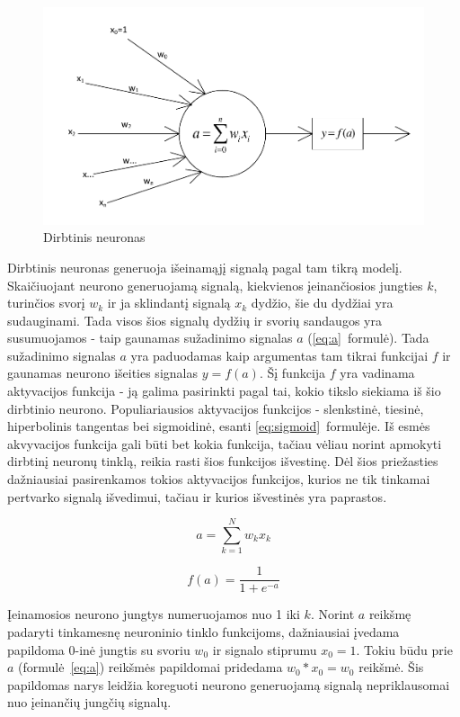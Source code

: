 \documentclass{VUMIFPSbakalaurinis}
\begin{document}
\begin{figure}
	\includegraphics[scale=0.75]{diagrams/1_neuron}
	\caption{Dirbtinis neuronas}
	\label{fig:neuron}
\end{figure}

Dirbtinis neuronas generuoja išeinamąjį signalą pagal tam tikrą modelį.
Skaičiuojant neurono generuojamą signalą, kiekvienos įeinančiosios jungties $k$, turinčios svorį $w_k$ ir ja sklindantį signalą $x_k$ dydžio, šie du dydžiai yra sudauginami.
Tada visos šios signalų dydžių ir svorių sandaugos yra susumuojamos - taip gaunamas sužadinimo signalas $a$ (\ref{eq:a}~formulė).
Tada sužadinimo signalas $a$ yra paduodamas kaip argumentas tam tikrai funkcijai $f$ ir gaunamas neurono išeities signalas $y = f(a)$.
Šį funkcija $f$ yra vadinama aktyvacijos funkcija - ją galima pasirinkti pagal tai, kokio tikslo siekiama iš šio dirbtinio neurono.
Populiariausios aktyvacijos funkcijos - slenkstinė, tiesinė, hiperbolinis tangentas bei sigmoidinė, esanti \ref{eq:sigmoid}~formulėje.
Iš esmės akvyvacijos funkcija gali būti bet kokia funkcija, tačiau vėliau norint apmokyti dirbtinį neuronų tinklą, reikia rasti šios funkcijos išvestinę.
Dėl šios priežasties dažniausiai pasirenkamos tokios aktyvacijos funkcijos, kurios ne tik tinkamai pertvarko signalą išvedimui, tačiau ir kurios išvestinės yra paprastos.

\begin{equation} \label{eq:a}
a = \sum_{k=1}^N w_kx_k
\end{equation}

\begin{equation} \label{eq:sigmoid}
f(a) = \frac{1}{1 + e^{-a}}
\end{equation}

Įeinamosios neurono jungtys numeruojamos nuo 1 iki $k$.
Norint $a$ reikšmę padaryti tinkamesnę neuroninio tinklo funkcijoms, dažniausiai įvedama papildoma $0$-inė jungtis su svoriu $w_0$ ir signalo stiprumu $x_0 = 1$.
Tokiu būdu prie $a$ (formulė~\ref{eq:a}) reikšmės papildomai pridedama $w_0 * x_0 = w_0$ reikšmė.
Šis papildomas narys leidžia koreguoti neurono generuojamą signalą nepriklausomai nuo įeinančių jungčių signalų.
\end{document}
